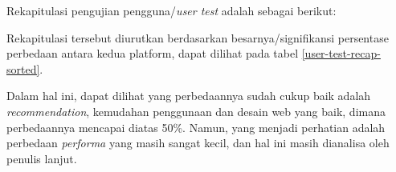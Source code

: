 Rekapitulasi pengujian pengguna/\textit{user test} adalah sebagai berikut:


\indent Rekapitulasi tersebut diurutkan berdasarkan besarnya/signifikansi persentase perbedaan antara kedua platform, dapat dilihat pada tabel \ref{user-test-recap-sorted}.

Dalam hal ini, dapat dilihat yang perbedaannya sudah cukup baik adalah \textit{recommendation}, kemudahan penggunaan dan desain web yang baik, dimana perbedaannya mencapai diatas 50\%. Namun, yang menjadi perhatian adalah perbedaan \textit{performa} yang masih sangat kecil, dan hal ini masih dianalisa oleh penulis lanjut.